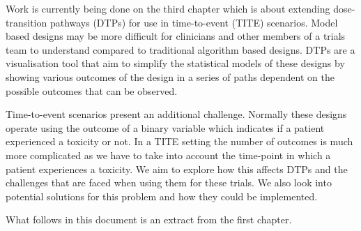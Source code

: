 Work is currently being done on the third chapter which is about extending dose-transition pathways (DTPs) for use in time-to-event (TITE) scenarios. Model based designs may be more difficult for clinicians and other members of a trials team to understand compared to traditional algorithm based designs. DTPs are a visualisation tool that aim to simplify the statistical models of these designs by showing various outcomes of the design in a series of paths dependent on the possible outcomes that can be observed. 

Time-to-event scenarios present an additional challenge. Normally these designs operate using the outcome of a binary variable which indicates if a patient experienced a toxicity or not. In a TITE setting the number of outcomes is much more complicated as we have to take into account the time-point in which a patient experiences a toxicity. We aim to explore how this affects DTPs and the challenges that are faced when using them for these trials. We also look into potential solutions for this problem and how they could be implemented. 

What follows in this document is an extract from the first chapter. 


